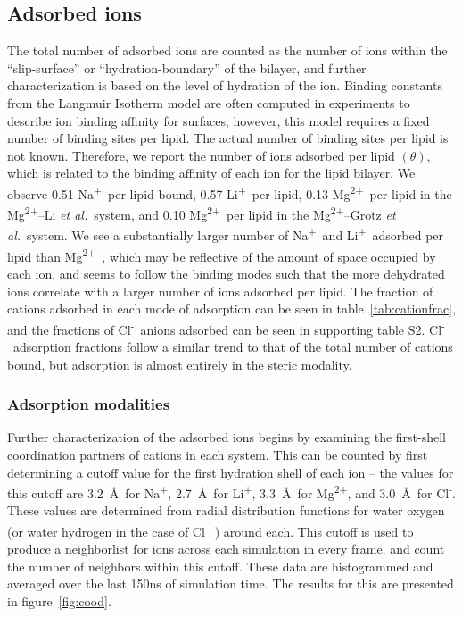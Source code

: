 \documentclass[journal=langd5,manuscript=article]{achemso}
\newcommand{\etal}{\textit{et al.}~}
\newcommand{\na}{Na\textsuperscript{+}~}
\newcommand{\cl}{Cl\textsuperscript{-}~}
\newcommand{\li}{Li\textsuperscript{+}~}
\newcommand{\mg}{Mg\textsuperscript{2+}~}
\newcommand{\mgmbnbfix}{Mg\textsuperscript{2+}--Li \etal} %
\newcommand{\mgmicro}{Mg\textsuperscript{2+}--Grotz \etal}
\begin{document}
\subsection{Adsorbed ions}
\label{sec:boundions}
The total number of adsorbed ions are counted as the number of ions within the ``slip-surface'' or ``hydration-boundary'' of the bilayer, and
further characterization is based on the level of hydration of the ion.
Binding constants from the Langmuir Isotherm model are often computed in experiments to describe ion binding affinity for
surfaces; however, this model requires a fixed number of binding sites per lipid. The actual number of binding sites
per lipid is not known. Therefore, we report the number of ions adsorbed per lipid $(\theta)$, which 
{is related to} 
the binding affinity of each ion for the lipid bilayer.
We observe 0.51 \na per lipid bound, 0.57 \li per lipid, 0.13 \mg per lipid in the \mgmbnbfix system, and 0.10 \mg per lipid
in the \mgmicro system. We see a substantially larger number of \na and \li adsorbed per lipid than
\mg, which may be reflective of the amount of space occupied by each ion, and seems to follow the
binding modes such that the more dehydrated ions correlate with a larger number of ions adsorbed per lipid.
The fraction of cations adsorbed in each mode of adsorption can be seen in table~\ref{tab:cationfrac}, and the fractions
of \cl anions adsorbed can be seen in {supporting table S2}.
\cl adsorption fractions follow a similar trend to that of the total number of cations bound, but adsorption
is almost entirely in the steric modality.




\subsubsection{Adsorption modalities}

Further characterization of the adsorbed ions begins by examining the first-shell coordination partners of cations in each system.
This can be counted by first determining a cutoff value for the first hydration shell of each ion 
-- the values for this cutoff are
3.2~\AA~for Na\textsuperscript{+}, 2.7~\AA~for Li\textsuperscript{+}, 3.3~\AA~for Mg\textsuperscript{2+}, 
and 3.0~\AA~for Cl\textsuperscript{-}. 
These values are determined from radial distribution 
functions for water oxygen (or water hydrogen in the case of \cl) around each. 
This cutoff is used to produce a neighborlist for ions
across each simulation in every frame, and count the number of neighbors within this cutoff. 
These data {are} histogrammed and averaged over
the last 150ns of simulation time. The results for this are presented in figure~\ref{fig:cood}.
\end{document}
